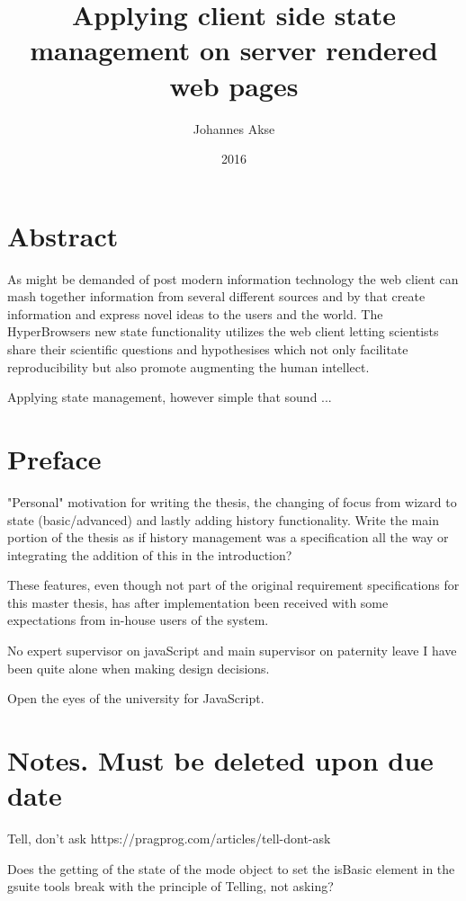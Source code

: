 \documentclass[english]{ifimaster}
\title{Applying client side state management on server rendered web pages}
\author{Johannes Akse}
\date{2016}
\begin{document}
\maketitle{}
\chapter*{Abstract}
As might be demanded of post modern information technology the web client can mash together information from several different sources and by that create information and express novel ideas to the users and the world. The HyperBrowsers new state functionality utilizes the web client letting scientists share their scientific questions and hypothesises which not only facilitate reproducibility but also promote augmenting the human intellect.

Applying state management, however simple that sound ... 

\tableofcontents
\nocite{*}

\chapter*{Preface}
"Personal" motivation for writing the thesis, the changing of focus from wizard to state (basic/advanced) and lastly adding history functionality. Write the main portion of the thesis as if history management was a specification all the way or integrating the addition of this in the introduction?

These features, even though not part of the original requirement specifications for this master thesis, has after implementation been received with some expectations from in-house users of the system. 

No expert supervisor on javaScript and main supervisor on paternity leave I have been quite alone when making design decisions. 

Open the eyes of the university for JavaScript.
\chapter*{Notes. Must be deleted upon due date}

 Tell, don't ask https://pragprog.com/articles/tell-dont-ask

 Does the getting of the state of the mode object to set the isBasic element in the gsuite tools break with the principle of Telling, not asking?
\end{document}
